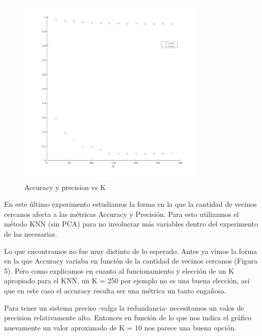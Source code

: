 \begin{figure}[H]
	\centering	
	\includegraphics[width=0.8\textwidth]{img/acu_pre.png}
	\caption{Accuracy y precision vs K}
	\label{fig: Accuracy y precision vs K con KNN}
\end{figure}
En este último experimento estudiamos la forma en la que la cantidad de vecinos cercanos afecta a las métricas Accuracy y Precisión. Para esto utilizamos el método KNN (sin PCA) para no involucrar más variables dentro del experimento de las necesarias.

Lo que encontramos no fue muy distinto de lo esperado. Antes ya vimos la forma en la que Accuracy variaba en función de la cantidad de vecinos cercanos (Figura 5). Pero como explicamos en cuanto al funcionamiento y elección de un K apropiado para el KNN, un K = 250 por ejemplo no es una buena elección, así que en este caso el accuracy resulta ser una métrica un tanto engañosa.

Para tener un sistema preciso -valga la redundancia- necesitamos un valos de precision relativamente alto. Entonces en función de lo que nos indica el gráfico nuevamente un valor aproximado de K = 10 nos parece una buena opción.